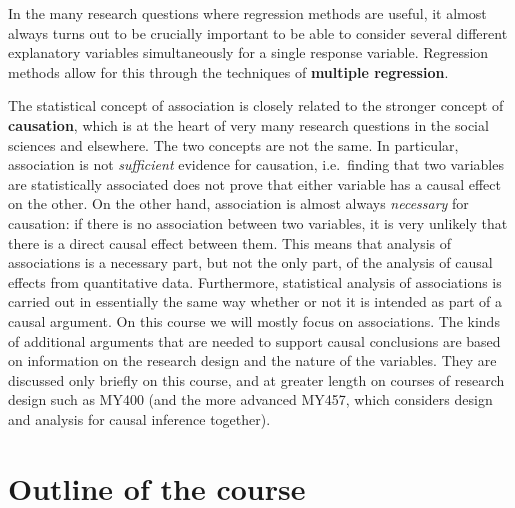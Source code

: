 In the many research questions where regression methods are useful, it
almost always turns out to be crucially important to be able to consider
several different explanatory variables simultaneously for a single
response variable. Regression methods allow for this
through the techniques of \textbf{multiple regression}.

The statistical concept of association is closely related to the
stronger concept of \textbf{causation}, which is at the heart of very
many research questions in the social sciences and elsewhere. The two
concepts are not the same. In particular, association is not
\emph{sufficient} evidence for causation, i.e.\ finding that two
variables are statistically associated does not prove that either
variable has a causal effect on the other. On the other hand,
association is almost always \emph{necessary} for causation: if
there is no association between two variables, it is very unlikely that
there is a direct causal effect between them. This means that analysis
of associations is a necessary part, but not the only part, of the
analysis of causal effects from quantitative data. Furthermore,
statistical analysis of associations is carried out in essentially the
same way whether or not it is intended as part of a causal argument. On
this course we will mostly focus on associations. The kinds of additional
arguments that are needed to support causal conclusions are based on
information on the
research design and the nature of the variables. They are discussed only
briefly on this course, and at greater length on courses of research design such as
MY400 (and the more advanced MY457, which considers design and analysis
for causal inference together).


\section{Outline of the course}
\label{s_intro_outline}

